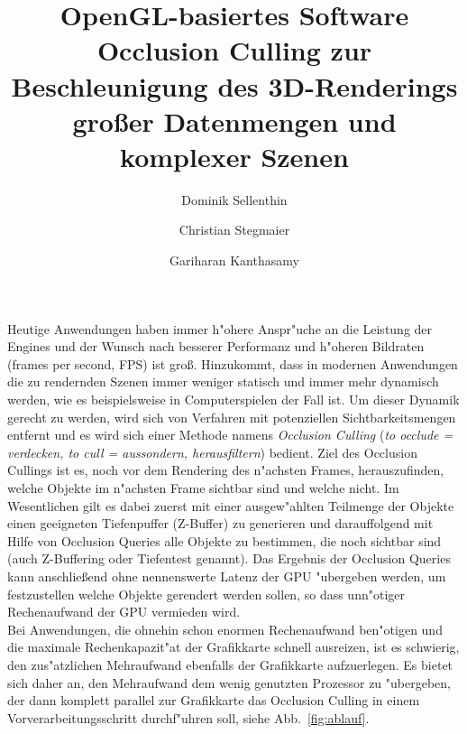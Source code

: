 \documentclass[journal]{vgtc}
\author{Dominik Sellenthin \and Christian Stegmaier \and Gariharan Kanthasamy}
\title{OpenGL-basiertes Software Occlusion Culling zur Beschleunigung des 3D-Renderings gro{\ss}er Datenmengen und komplexer Szenen}
\begin{document}


\maketitle

Heutige Anwendungen haben immer h"ohere Anspr"uche an die Leistung der Engines und der Wunsch nach besserer Performanz und h"oheren Bildraten (frames per second, FPS) ist gro{\ss}.
Hinzukommt, dass in modernen Anwendungen die zu rendernden Szenen immer weniger statisch und immer mehr dynamisch werden, wie es beispielsweise in Computerspielen der Fall ist.
Um dieser Dynamik gerecht zu werden, wird sich von Verfahren mit potenziellen Sichtbarkeitsmengen entfernt \cite{MSOC} und es wird sich einer Methode namens \textit{Occlusion Culling} (\textit{to occlude = verdecken, to cull = aussondern, herausfiltern}) bedient.
Ziel des Occlusion Cullings ist es, noch vor dem Rendering des n"achsten Frames, herauszufinden, welche Objekte im n"achsten Frame sichtbar sind und welche nicht.
Im Wesentlichen gilt es dabei zuerst mit einer ausgew"ahlten Teilmenge der Objekte einen geeigneten Tiefenpuffer (Z-Buffer) zu generieren und darauffolgend mit Hilfe von Occlusion Queries alle Objekte zu bestimmen, die noch sichtbar sind (auch Z-Buffering oder Tiefentest genannt).
Das Ergebnis der Occlusion Queries kann anschlie{\ss}end ohne nennenswerte Latenz der GPU "ubergeben werden, um festzustellen welche Objekte gerendert werden sollen, so dass unn"otiger Rechenaufwand der GPU vermieden wird.\\

Bei Anwendungen, die ohnehin schon enormen Rechenaufwand ben"otigen und die maximale Rechenkapazit"at der Grafikkarte schnell ausreizen, ist es schwierig, den zus"atzlichen Mehraufwand ebenfalls der Grafikkarte aufzuerlegen.
Es bietet sich daher an, den Mehraufwand dem wenig genutzten Prozessor zu "ubergeben, der dann komplett parallel zur Grafikkarte das Occlusion Culling in einem Vorverarbeitungsschritt durchf"uhren soll, siehe Abb.\ \ref{fig:ablauf}.
\end{document}
